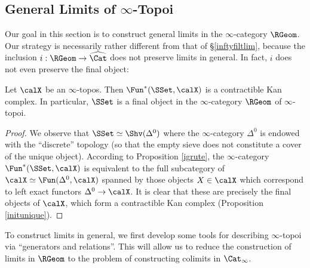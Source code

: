 \subsection{General Limits of $\infty$-Topoi}\label{genlim}

Our goal in this section is to construct general limits in the $\infty$-category $\RGeom$. Our strategy is necessarily rather different from that of \S \ref{inftyfiltlim}, because the inclusion
$i: \RGeom \rightarrow \widehat{\Cat}$ does not preserve limits in general.
In fact, $i$ does not even preserve the final object:

\begin{proposition}\label{spacefinall}
Let $\calX$ be an $\infty$-topos. Then $\Fun^{\ast}(\SSet, \calX)$ is a contractible Kan complex.
In particular, $\SSet$ is a final object in the $\infty$-category $\RGeom$ of $\infty$-topoi.
\end{proposition}

\begin{proof}
We observe that $\SSet \simeq \Shv(\Delta^0)$ where the $\infty$-category $\Delta^0$ is endowed with the ``discrete'' topology (so that the empty sieve does not constitute a cover
of the unique object). According to Proposition \ref{igrute}, the $\infty$-category
$\Fun^{\ast}(\SSet, \calX)$ is equivalent to the full subcategory of $\calX \simeq \Fun(\Delta^0, \calX)$ spanned
by those objects $X \in \calX$ which correspond to left exact functors $\Delta^0 \rightarrow \calX$.
It is clear that these are precisely the final objects of $\calX$, which form a contractible Kan complex
(Proposition \ref{initunique}). 
\end{proof}

To construct limits in general, we first develop some tools for describing $\infty$-topoi via
``generators and relations''. This will allow us to reduce the construction of limits in $\RGeom$ to the problem of constructing colimits in $\Cat_{\infty}$.


